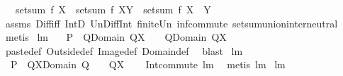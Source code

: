 \begin{isabellebody}
\ \ \ {\isachardoublequoteopen}setsum\ f\ X\ {\isacharequal}\ setsum\ f\ {\isacharparenleft}X{\isacharminus}Y{\isacharparenright}\ {\isacharplus}\ {\isacharparenleft}setsum\ f\ {\isacharparenleft}X\ {\isasyminter}\ Y{\isacharparenright}{\isacharparenright}{\isachardoublequoteclose}\ \isanewline
%
\isadelimproof
\ \ %
\endisadelimproof
%
\isatagproof
{}\isamarkupfalse%
\ assms\ Diff{\isacharunderscore}iff\ IntD{}\ Un{\isacharunderscore}Diff{\isacharunderscore}Int\ finite{\isacharunderscore}Un\ inf{\isacharunderscore}commute\ setsum{\isachardot}union{\isacharunderscore}inter{\isacharunderscore}neutral\ \isanewline
\ \ \isamarkupfalse%
\ metis%
\endisatagproof
{\isafoldproof}%
%
\isadelimproof
\isanewline
%
\endisadelimproof
\isanewline
{}\isamarkupfalse%
\ lm{}{}{}{\isacharcolon}\ \isanewline
\ \ {\isachardoublequoteopen}{\isacharparenleft}P\ {\isacharplus}{\isacharasterisk}\ Q{\isacharparenright}{\isacharbackquote}{\isacharbackquote}{\isacharparenleft}Domain\ Q{\isasyminter}X{\isacharparenright}\ \ {\isacharequal}\ \ Q{\isacharbackquote}{\isacharbackquote}{\isacharparenleft}Domain\ Q{\isasyminter}X{\isacharparenright}{\isachardoublequoteclose}\ \isanewline
%
\isadelimproof
\ \ %
\endisadelimproof
%
\isatagproof
{}\isamarkupfalse%
\ paste{\isacharunderscore}def\ Outside{\isacharunderscore}def\ Image{\isacharunderscore}def\ Domain{\isacharunderscore}def\ \isamarkupfalse%
\ blast%
\endisatagproof
{\isafoldproof}%
%
\isadelimproof
\isanewline
%
\endisadelimproof
\isanewline
{}\isamarkupfalse%
\ lm{}{}{}{\isacharcolon}\ \isanewline
\ \ {\isachardoublequoteopen}{\isacharparenleft}P\ {\isacharplus}{\isacharasterisk}\ Q{\isacharparenright}{\isacharbackquote}{\isacharbackquote}{\isacharparenleft}X{\isasyminter}{\isacharparenleft}Domain\ Q{\isacharparenright}{\isacharparenright}\ \ {\isacharequal}\ \ Q{\isacharbackquote}{\isacharbackquote}X{\isachardoublequoteclose}\isanewline
%
\isadelimproof
\ \ %
\endisadelimproof
%
\isatagproof
{}\isamarkupfalse%
\ Int{\isacharunderscore}commute\ lm{}{}{}\ \isamarkupfalse%
\ {\isacharparenleft}metis\ lm{}{}{}{\isacharparenright}%
\endisatagproof
{\isafoldproof}%
%
\isadelimproof
\isanewline
%
\endisadelimproof
\isanewline
{}\isamarkupfalse%
\ lm{}{}{}{\isacharcolon}\ \isanewline

\end{isabellebody}
